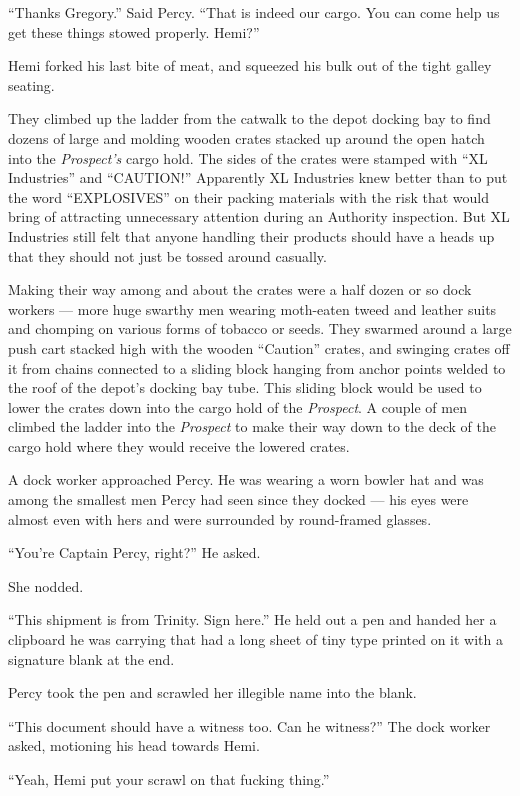 \documentclass[]{scrbook}
\begin{document}
``Thanks Gregory.'' Said Percy. ``That is indeed our cargo. You can come
help us get these things stowed properly. Hemi?''

Hemi forked his last bite of meat, and squeezed his bulk out of the
tight galley seating.

They climbed up the ladder from the catwalk to the depot docking bay to
find dozens of large and molding wooden crates stacked up around the
open hatch into the \emph{Prospect's} cargo hold. The sides of the
crates were stamped with ``XL Industries'' and ``CAUTION!'' Apparently
XL Industries knew better than to put the word ``EXPLOSIVES'' on their
packing materials with the risk that would bring of attracting
unnecessary attention during an Authority inspection. But XL Industries
still felt that anyone handling their products should have a heads up
that they should not just be tossed around casually.

Making their way among and about the crates were a half dozen or so dock
workers --- more huge swarthy men wearing moth-eaten tweed and leather
suits and chomping on various forms of tobacco or seeds. They swarmed
around a large push cart stacked high with the wooden ``Caution''
crates, and swinging crates off it from chains connected to a sliding
block hanging from anchor points welded to the roof of the depot's
docking bay tube. This sliding block would be used to lower the crates
down into the cargo hold of the \emph{Prospect}. A couple of men climbed
the ladder into the \emph{Prospect} to make their way down to the deck
of the cargo hold where they would receive the lowered crates.

A dock worker approached Percy. He was wearing a worn bowler hat and was
among the smallest men Percy had seen since they docked --- his eyes
were almost even with hers and were surrounded by round-framed glasses.

``You're Captain Percy, right?'' He asked.

She nodded.

``This shipment is from Trinity. Sign here.'' He held out a pen and
handed her a clipboard he was carrying that had a long sheet of tiny
type printed on it with a signature blank at the end.

Percy took the pen and scrawled her illegible name into the blank.

``This document should have a witness too. Can he witness?'' The dock
worker asked, motioning his head towards Hemi.

``Yeah, Hemi put your scrawl on that fucking thing.''
\end{document}
